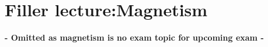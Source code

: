 \section{ Filler lecture:Magnetism }\label{sec:q3}    

\textbf{- Omitted as magnetism is no exam topic for upcoming exam -}